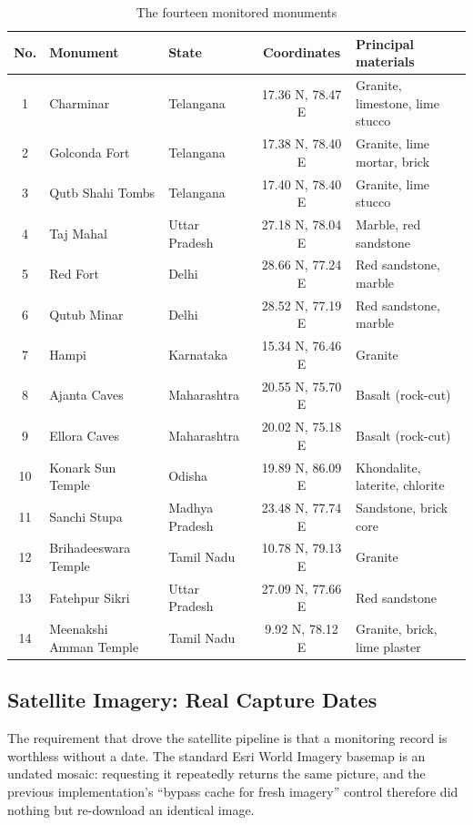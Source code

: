 \documentclass[a4paper,12pt,oneside]{book}
\begin{document}
\begin{table}[H]
\centering
\caption{The fourteen monitored monuments}
\label{tab:monuments}
\renewcommand{\arraystretch}{1.15}
{\footnotesize
\begin{tabular}{|c|l|l|c|l|}
\hline
\textbf{No.} & \textbf{Monument} & \textbf{State} & \textbf{Coordinates} & \textbf{Principal materials} \\ \hline
1 & Charminar & Telangana & 17.36 N, 78.47 E & Granite, limestone, lime stucco \\ \hline
2 & Golconda Fort & Telangana & 17.38 N, 78.40 E & Granite, lime mortar, brick \\ \hline
3 & Qutb Shahi Tombs & Telangana & 17.40 N, 78.40 E & Granite, lime stucco \\ \hline
4 & Taj Mahal & Uttar Pradesh & 27.18 N, 78.04 E & Marble, red sandstone \\ \hline
5 & Red Fort & Delhi & 28.66 N, 77.24 E & Red sandstone, marble \\ \hline
6 & Qutub Minar & Delhi & 28.52 N, 77.19 E & Red sandstone, marble \\ \hline
7 & Hampi & Karnataka & 15.34 N, 76.46 E & Granite \\ \hline
8 & Ajanta Caves & Maharashtra & 20.55 N, 75.70 E & Basalt (rock-cut) \\ \hline
9 & Ellora Caves & Maharashtra & 20.02 N, 75.18 E & Basalt (rock-cut) \\ \hline
10 & Konark Sun Temple & Odisha & 19.89 N, 86.09 E & Khondalite, laterite, chlorite \\ \hline
11 & Sanchi Stupa & Madhya Pradesh & 23.48 N, 77.74 E & Sandstone, brick core \\ \hline
12 & Brihadeeswara Temple & Tamil Nadu & 10.78 N, 79.13 E & Granite \\ \hline
13 & Fatehpur Sikri & Uttar Pradesh & 27.09 N, 77.66 E & Red sandstone \\ \hline
14 & Meenakshi Amman Temple & Tamil Nadu & 9.92 N, 78.12 E & Granite, brick, lime plaster \\ \hline
\end{tabular}}
\end{table}

\subsection{Satellite Imagery: Real Capture Dates}
The requirement that drove the satellite pipeline is that a monitoring record is worthless without a date. The standard Esri World Imagery basemap is an undated mosaic: requesting it repeatedly returns the same picture, and the previous implementation's ``bypass cache for fresh imagery'' control therefore did nothing but re-download an identical image.
\end{document}

